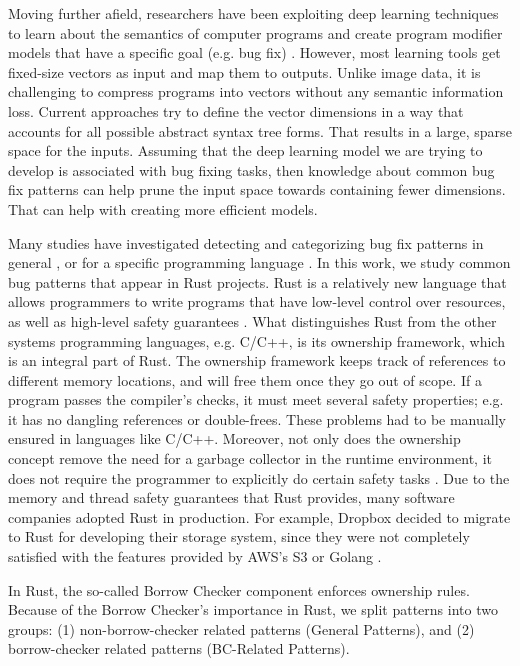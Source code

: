 Moving further afield, researchers have been exploiting deep learning techniques to learn about the semantics of computer programs and create program modifier models that have a specific goal (e.g. bug fix) \cite{alon2019code2vec} \cite{alon2018general} \cite{raychev2016learning} \cite{bielik2016phog}. However, most learning tools get fixed-size vectors as input and map them to outputs. Unlike image data, it is challenging to compress programs into vectors without any semantic information loss. Current approaches try to define the vector dimensions in a way that accounts for all possible abstract syntax tree forms. That results in a large, sparse space for the inputs. Assuming that the deep learning model we are trying to develop is associated with bug fixing tasks, then knowledge about common bug fix patterns can help prune the input space towards containing fewer dimensions. That can help with creating more efficient models.


Many studies have investigated detecting and categorizing bug fix patterns in general \cite{islam2021changes} \cite{madeiral2018towards} \cite{pan2009toward}, or for a specific programming language \cite{yang2022mining} \cite{hanam2016discovering} \cite{campos2019discovering}. In this work, we study common bug patterns that appear in Rust projects. Rust is a relatively new language that allows programmers to write programs that have low-level control over resources, as well as high-level safety guarantees \cite{klabnik2019rust}. What distinguishes Rust from the other systems programming languages, e.g. C/C++, is its ownership framework, which is an integral part of Rust. The ownership framework keeps track of references to different memory locations, and will free them once they go out of scope. If a program passes the compiler’s checks, it must meet several safety properties; e.g. it has no dangling references or double-frees. These problems had to be manually ensured in languages like C/C++. Moreover, not only does the ownership concept remove the need for a garbage collector in the runtime environment, it does not require the programmer to explicitly do certain safety tasks \cite{qin2020understanding}. Due to the memory and thread safety guarantees that Rust provides, many software companies adopted Rust in production. For example, Dropbox decided to migrate to Rust for developing their storage system, since they were not completely satisfied with the features provided by AWS’s S3 or Golang \cite{dropbox}.

In Rust, the so-called Borrow Checker component enforces ownership rules. Because of the Borrow Checker's importance in Rust, we split patterns into two groups: (1) non-borrow-checker related patterns (General Patterns), and (2) borrow-checker related patterns (BC-Related Patterns). \\


